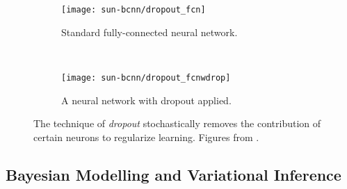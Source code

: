 \begin{figure}
\centering
\begin{subfigure}{0.45\textwidth}
	\centering
    \texttt{[image: sun-bcnn/dropout\_fcn]}
    \caption{Standard fully-connected neural network.}
\end{subfigure}
~
\begin{subfigure}{0.45\textwidth}
	\centering
    \texttt{[image: sun-bcnn/dropout\_fcnwdrop]}
    \caption{A neural network with dropout applied.}
\end{subfigure}
\caption{The technique of \textit{dropout} stochastically removes the contribution of certain neurons to regularize learning. Figures	 from \cite{srivastava_dropout_2014}.}
\label{fig:sun-bcnn_fcn_dropout}
\end{figure}

\subsection{Bayesian Modelling and Variational Inference}

